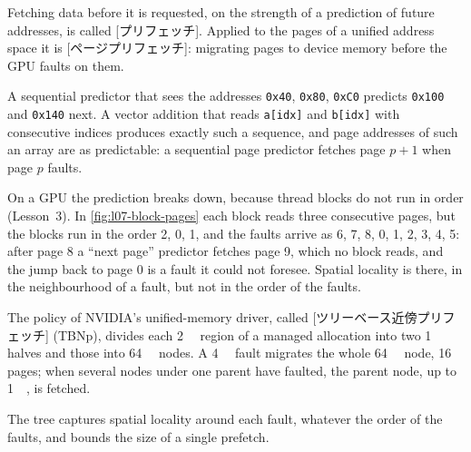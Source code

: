 \documentclass[../main.tex]{subfiles}
\begin{document}
\begin{definition}[Prefetching]
  \label{def:l07-prefetching}
  Fetching data before it is requested, on the strength of a
  prediction of future addresses, is called
  [プリフェッチ].
  Applied to the pages of a unified address space it is
  [ページプリフェッチ]: migrating pages to device
  memory before the GPU faults on them.
\end{definition}

A sequential predictor that sees the addresses \texttt{0x40},
\texttt{0x80}, \texttt{0xC0} predicts \texttt{0x100} and
\texttt{0x140} next.  A vector addition that reads \texttt{a[idx]} and
\texttt{b[idx]} with consecutive indices produces exactly such a
sequence, and page addresses of such an array are as predictable: a
sequential page predictor fetches page $p+1$ when page $p$ faults.

\begin{marginfigure}
  
  \caption{Nine pages read by three thread blocks that run in the
    order 2, 0, 1: the faults arrive as 6, 7, 8, 0, 1, \ldots}
  \label{fig:l07-block-pages}
\end{marginfigure}

On a GPU the prediction breaks down, because thread blocks do not run
in order (Lesson~3).  In \cref{fig:l07-block-pages} each block reads
three consecutive pages, but the blocks run in the order 2, 0, 1, and
the faults arrive as 6, 7, 8, 0, 1, 2, 3, 4, 5: after page 8 a
\enquote{next page} predictor fetches page 9, which no block reads, and
the jump back to page 0 is a fault it could not foresee.  Spatial locality is there, in the neighbourhood of a
fault, but not in the order of the faults.

\begin{definition}
  \label{def:l07-tbnp}
  The policy of NVIDIA's unified-memory driver, called
  [ツリーベース近傍プリフェッチ]
  (TBNp), divides each
  \SI{2}{\mebi\byte} region of a managed allocation into two
  \SI{1}{\mebi\byte} halves and those into \SI{64}{\kibi\byte} nodes.
  A \SI{4}{\kibi\byte} fault migrates the whole \SI{64}{\kibi\byte}
  node, 16 pages; when several nodes under one parent have faulted, the
  parent node, up to \SI{1}{\mebi\byte}, is fetched.
\end{definition}

The tree captures spatial locality around each fault, whatever the
order of the faults, and bounds the size of a single prefetch.
\end{document}
